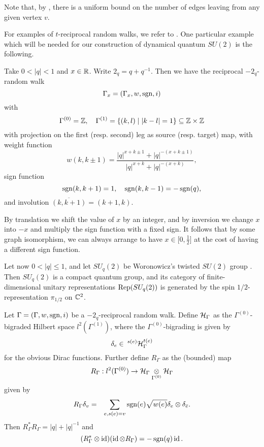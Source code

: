 
Note that, by \cite[Proposition 3.1]{DCY1}, there is a uniform bound on the number of edges leaving from any given vertex $v$.

For examples of $t$-reciprocal random walks, we refer to \cite{DCY1}. One particular example which will be needed for our construction of dynamical quantum $SU(2)$ is the following.

\begin{Exa}\label{ExaGraphPod} Take $0<|q|<1$ and $x\in \R$. Write $2_q = q+q^{-1}$. Then we have the reciprocal $-2_q$-random walk \[\Gamma_x =(\Gamma_x,w,\sgn,i)\] with \[ \Gamma^{(0)} = \Z,\quad \Gamma^{(1)} = \{(k,l)\mid |k-l|= 1\}\subseteq \Z\times \Z\] with projection on the first (resp. second) leg as source (resp. target) map, with weight function \[w(k,k\pm 1) = \frac{|q|^{x+k\pm 1}+|q|^{-(x+k\pm 1)}}{|q|^{x+k}+|q|^{-(x+k)}},\] sign function \[\sgn(k,k+1) = 1,\quad \sgn(k,k-1) = -\sgn(q),\] and involution $\overline{(k,k+1)} = (k+1,k)$. 

By translation we shift the value of $x$ by an integer, and by inversion we change $x$ into $-x$ and multiply the sign function with a fixed sign. It follows that by some graph isomorphism, we can always arrange to have $x\in \lbrack 0,\frac{1}{2}\rbrack$ at the cost of having a different sign function.
\end{Exa} 

Let now $0<|q|\leq 1$, and let $SU_q(2)$ be Woronowicz's twisted $SU(2)$ group \cite{Wor1}. Then $SU_q(2)$ is a compact quantum group, and its category of finite-dimensional unitary representations $\Rep(SU_q(2))$ is generated by the spin $1/2$-representation $\pi_{1/2}$ on $\C^2$.

Let $\Gamma = (\Gamma,w,\sgn,i)$ be a $-2_q$-reciprocal random walk. Define $\Hsp_{\Gamma}$ as the $\Gamma^{(0)}$-bigraded Hilbert space $l^2(\Gamma^{(1)})$, where the $\Gamma^{(0)}$-bigrading is given by \[\delta_e \in \Gru{\Hsp_{\Gamma}}{s(e)}{t(e)}\] for the obvious Dirac functions. Further define $R_{\Gamma}$ as the (bounded) map \[R_{\Gamma}:l^2(\Gamma^{(0)})\rightarrow \Hsp_{\Gamma}\underset{\Gamma^{(0)}}{\otimes} \Hsp_{\Gamma}\] given by \begin{eqnarray*} R_{\Gamma} \delta_v &=& \sum_{e,s(e) = v} \sgn(e)\sqrt{w(e)}\delta_e \otimes \delta_{\bar{e}}.\end{eqnarray*} Then $R_{\Gamma}^*R_{\Gamma} = |q|+|q|^{-1}$ and \[(R_{\Gamma}^*\otimes \id)(\id\otimes R_{\Gamma}) = -\sgn(q)\id.\]


